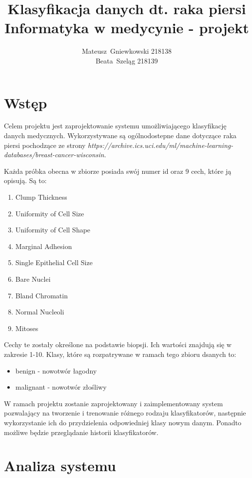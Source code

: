 \documentclass[a4paper, 11pt]{report}
\author{Mateusz~Gniewkowski 218138 \\
		Beata~Szeląg 218139}
\title{\huge Klasyfikacja danych dt. raka piersi \\
			 Informatyka w medycynie - projekt}
\date {}
\begin{document}
\maketitle
\tableofcontents{}


 
 
\chapter{Wstęp}


Celem projektu jest zaprojektowanie systemu umożliwiającego klasyfikację danych medycznych. Wykorzystywane są ogólnodostepne dane dotyczące raka piersi pochodzące ze strony \textit{https://archive.ics.uci.edu/ml/machine-learning-databases/breast-cancer-wisconsin}.

Każda próbka obecna w zbiorze posiada swój numer id oraz 9 cech, które ją opisują. Są to:
\begin{enumerate}
\item Clump Thickness              
\item Uniformity of Cell Size       
\item Uniformity of Cell Shape     
\item Marginal Adhesion             
\item Single Epithelial Cell Size  
\item Bare Nuclei                  
\item Bland Chromatin              
\item Normal Nucleoli               
\item Mitoses                       
\end{enumerate}
Cechy te zostały określone na podstawie biopsji. Ich wartości znajdują się w zakresie 1-10.
Klasy, które są rozpatrywane w ramach tego zbioru dsanych to:
\begin{itemize}
\item benign - nowotwór łagodny
\item malignant - nowotwór złośliwy
\end{itemize}

W ramach projektu zostanie zaprojektowany i zaimplementowany system pozwalający na tworzenie i trenowanie różnego rodzaju klasyfikatorów, następnie wykorzystanie ich do przydzielenia odpowiedniej klasy nowym danym. Ponadto możliwe będzie przeglądanie historii klasyfikatorów.


\chapter{Analiza systemu}
\end{document}
